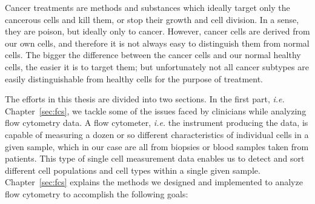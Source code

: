 Cancer treatments are methods and substances which ideally target only the
cancerous cells and kill them, or stop their growth and cell division. In a
sense, they are poison, but ideally only to cancer. However, cancer cells are
derived from our own cells, and therefore it is not always easy to distinguish
them from normal cells. The bigger the difference between the cancer cells and
our normal healthy cells, the easier it is to target them; but unfortunately
not all cancer subtypes are easily distinguishable from healthy cells for the
purpose of treatment.

The efforts in this thesis are divided into two sections. In the first part,
\emph{i.e.} Chapter~\ref{sec:fcs}, we tackle some of the issues faced by
clinicians while analyzing flow cytometry data. A flow cytometer, \emph{i.e.}
the instrument producing the data, is capable of measuring a dozen or so
different characteristics of individual cells in a given sample, which in our
case are all from biopsies or blood samples taken from patients. This type of
single cell measurement data enables us to detect and sort different cell
populations and cell types within a single given sample. Chapter~\ref{sec:fcs}
explains the methods we designed and implemented to analyze flow cytometry to
accomplish the following goals:

